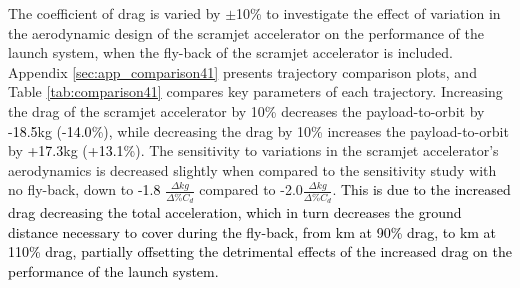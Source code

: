 \noindent
The coefficient of drag is varied by $\pm$10\% to investigate the effect of variation in the aerodynamic design of the scramjet accelerator on the performance of the launch system, when the fly-back of the scramjet accelerator is included. Appendix \ref{sec:app_comparison41} presents trajectory comparison plots, and Table \ref{tab:comparison41} compares key parameters of each trajectory. 
Increasing the drag of the scramjet accelerator by 10\% decreases the payload-to-orbit by \textcolor{black}{-18.5}kg (\textcolor{black}{-14.0}\%), while decreasing the drag by 10\% increases the payload-to-orbit by \textcolor{black}{+17.3}kg (\textcolor{black}{+13.1}\%). 
The sensitivity to variations in the scramjet accelerator's aerodynamics is decreased slightly when compared to the sensitivity study with no fly-back, down to \textcolor{black}{-1.8} $\frac{\Delta kg}{\Delta\% C_{d}}$ compared to -2.0$\frac{\Delta kg}{\Delta\% C_{d}}$.
\textcolor{black}{This is due to the increased drag decreasing the total acceleration, which in turn decreases the ground distance necessary to cover during the fly-back, from \returnDistCdNinety km at 90\% drag, to \returnDistCdOneHundredTen km at 110\% drag, partially offsetting the detrimental effects of the increased drag on the performance of the launch system. }

